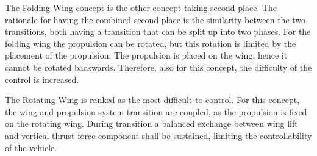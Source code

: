 The Folding Wing concept is the other concept taking second place.
The rationale for having the combined second place is the similarity between the two transitions, both having a transition that can be split up into two phases.
For the folding wing the propulsion can be rotated, but this rotation is limited by the placement of the propulsion.
The propulsion is placed on the wing, hence it cannot be rotated backwards.
Therefore, also for this concept, the difficulty of the control is increased.

The Rotating Wing is ranked as the most difficult to control.
For this concept, the wing and propulsion system transition are coupled, as the propulsion is fixed on the rotating wing.
During transition a balanced exchange between wing lift and vertical thrust force component shall be sustained, limiting the controllability of the vehicle.






